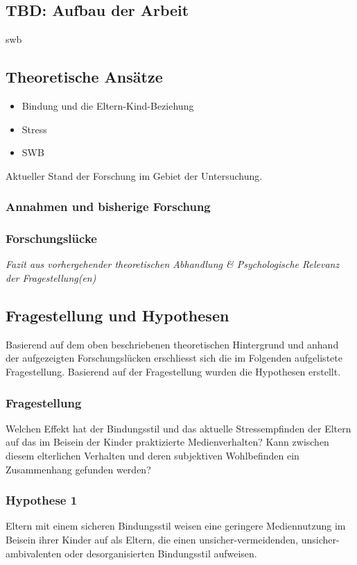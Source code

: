 \subsection{TBD: Aufbau der Arbeit}
\gls{swb}


\subsection{Theoretische Ansätze}
\begin{itemize}
 \item Bindung und die Eltern-Kind-Beziehung 
 \item Stress
 \item SWB
\end{itemize}
Aktueller Stand der Forschung im Gebiet der Untersuchung.

\subsubsection{Annahmen und bisherige Forschung}
\subsubsection{Forschungslücke}
\textit{Fazit aus vorhergehender theoretischen Abhandlung \& Psychologische Relevanz der Fragestellung(en)}


\subsection{Fragestellung und Hypothesen} \label{sec:Fragestellung}
Basierend auf dem oben beschriebenen theoretischen Hintergrund und anhand der aufgezeigten Forschungslücken erschliesst sich die im Folgenden aufgelistete Fragestellung. Basierend auf der Fragestellung wurden die Hypothesen erstellt.
\subsubsection{Fragestellung} 
Welchen Effekt hat der Bindungsstil und das aktuelle Stressempfinden der Eltern auf das im Beisein der Kinder praktizierte Medienverhalten? Kann zwischen diesem elterlichen Verhalten und deren subjektiven Wohlbefinden ein Zusammenhang gefunden werden?
\subsubsection{Hypothese 1}
Eltern mit einem sicheren Bindungsstil weisen eine geringere Mediennutzung im Beisein ihrer Kinder auf als Eltern, die einen unsicher-vermeidenden, unsicher-ambivalenten oder desorganisierten Bindungsstil aufweisen.

